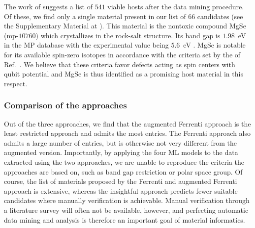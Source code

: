 \documentclass[superscriptaddress,unsortedaddress,
 amsmath,amssymb,
 aps,
]{revtex4-2}
\newcommand{\oliver}[1]{\textcolor{violet}{#1}}
\begin{document}
The work of \citeauthor{Ferrenti2020} \cite{Ferrenti2020} suggests a list of $541$ viable hosts after the data mining procedure.  
Of these, we find only a single material present in our list of $66$ candidates (see the Supplementary Material at \cite{supplementary}). This material is the nontoxic compound MgSe (mp-$10760$) which crystallizes in the rock-salt structure. Its band gap is $1.98$~eV in the MP database with the experimental value being $5.6$~eV  \cite{SaumGeorge1959}. MgSe is notable for its available spin-zero isotopes in accordance with the criteria set by the of Ref.~\cite{Ferrenti2020}. We believe that these criteria favor defects acting as spin centers with qubit potential and MgSe is thus identified as a promising host material in this respect.  


\subsubsection*{Comparison of the approaches}

Out of the three approaches, we find that the augmented Ferrenti approach is the least restricted approach and admits the most entries. The Ferrenti approach also admits a large number of entries, but is otherwise not very different from the augmented version. 
Importantly, by applying the four ML models to the data extracted using the two approaches, we are unable to reproduce the criteria the approaches are based on, such as band gap restriction or polar space group. Of course, the list of materials proposed by the Ferrenti and augmented Ferrenti approach is extensive, whereas the insightful approach predicts fewer suitable candidates where manually verification is achievable.  
Manual verification through a literature survey will often not be available, however, and perfecting automatic data mining and analysis is therefore an important goal of material informatics. 
\end{document}
